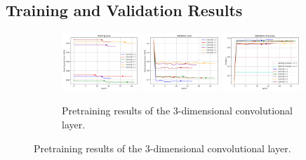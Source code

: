 \documentclass[./main.tex]{subfiles}
\begin{document}
\subsection{Training and Validation Results}
\begin{figure}[htbp]
    \centering
     \begin{subfigure}[b]{\textwidth}
         \centering
         \includegraphics[width=0.32\textwidth]{./entities/pretrain_res/baseline/train_losses.png}
         \includegraphics[width=0.32\textwidth]{./entities/pretrain_res/baseline/val_losses.png}
         \includegraphics[width=0.32\textwidth]{./entities/pretrain_res/baseline/val_accs.png}
         \caption{Pretraining results of the 3-dimensional convolutional layer.}
     \end{subfigure}
    \hfill


\end{figure}
\end{document}
